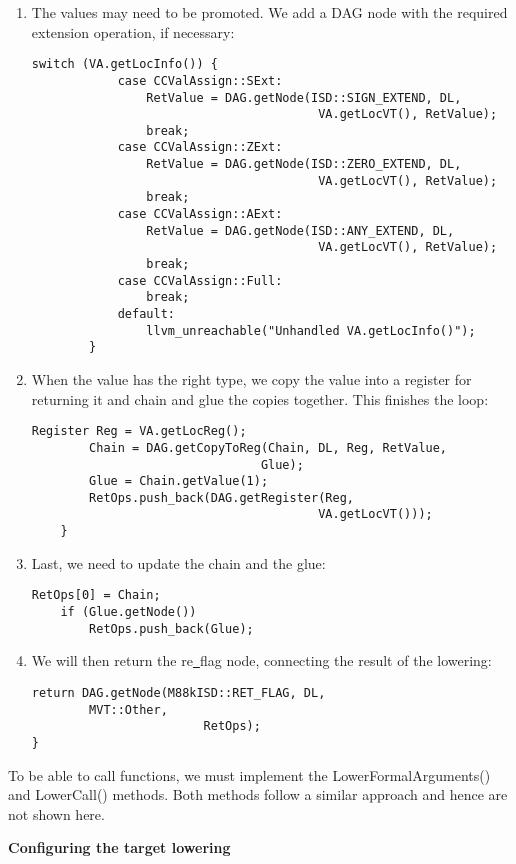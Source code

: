 \begin{enumerate}
\item The values may need to be promoted. We add a DAG node with the required extension operation, if necessary:
\begin{lstlisting}[caption={}]
		switch (VA.getLocInfo()) {
			case CCValAssign::SExt:
				RetValue = DAG.getNode(ISD::SIGN_EXTEND, DL,
										VA.getLocVT(), RetValue);
				break;
			case CCValAssign::ZExt:
				RetValue = DAG.getNode(ISD::ZERO_EXTEND, DL,
										VA.getLocVT(), RetValue);
				break;
			case CCValAssign::AExt:
				RetValue = DAG.getNode(ISD::ANY_EXTEND, DL,
										VA.getLocVT(), RetValue);
				break;
			case CCValAssign::Full:
				break;
			default:
				llvm_unreachable("Unhandled VA.getLocInfo()");
		}
\end{lstlisting}

\item When the value has the right type, we copy the value into a register for returning it and chain and glue the copies together. This finishes the loop:
\begin{lstlisting}[caption={}]
		Register Reg = VA.getLocReg();
		Chain = DAG.getCopyToReg(Chain, DL, Reg, RetValue,
								Glue);
		Glue = Chain.getValue(1);
		RetOps.push_back(DAG.getRegister(Reg,
										VA.getLocVT()));
	}
\end{lstlisting}

\item Last, we need to update the chain and the glue:
\begin{lstlisting}[caption={}]
	RetOps[0] = Chain;
	if (Glue.getNode())
		RetOps.push_back(Glue);
\end{lstlisting}
	
\item We will then return the re\underline{~}flag node, connecting the result of the lowering:
\begin{lstlisting}[caption={}]
	return DAG.getNode(M88kISD::RET_FLAG, DL,
		MVT::Other,
						RetOps);
}
\end{lstlisting}
	
\end{enumerate}

To be able to call functions, we must implement the LowerFormalArguments() and LowerCall() methods. Both methods follow a similar approach and hence are not shown here.\par

\hspace*{\fill} \par %
\textbf{Configuring the target lowering}

